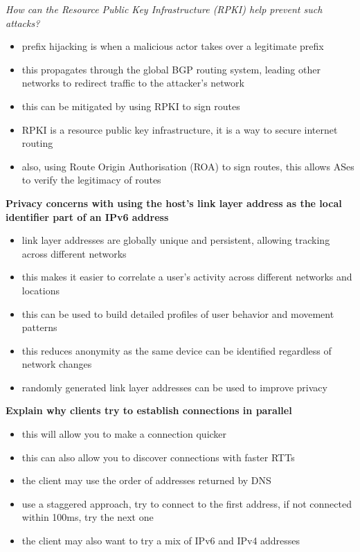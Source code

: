 \documentclass{article}
\begin{document}
\textit{How can the Resource Public Key Infrastructure (RPKI) help prevent such attacks?}
\begin{itemize}
    \item prefix hijacking is when a malicious actor takes over a legitimate prefix
    \item this propagates through the global BGP routing system, leading other networks to redirect traffic to the attacker's network
    \item this can be mitigated by using RPKI to sign routes
    \item RPKI is a resource public key infrastructure, it is a way to secure internet routing
    \item also, using Route Origin Authorisation (ROA) to sign routes, this allows ASes to verify the legitimacy of routes
\end{itemize}

\textbf{Privacy concerns with using the host's link layer address as the local identifier part of an IPv6 address}
\begin{itemize}
    \item link layer addresses are globally unique and persistent, allowing tracking across different networks
    \item this makes it easier to correlate a user's activity across different networks and locations
    \item this can be used to build detailed profiles of user behavior and movement patterns
    \item this reduces anonymity as the same device can be identified regardless of network changes
    \item randomly generated link layer addresses can be used to improve privacy
\end{itemize}


\textbf{Explain why clients try to establish connections in parallel}
\begin{itemize}
    \item this will allow you to make a connection quicker
    \item this can also allow you to discover connections with faster RTTs
    \item the client may use the order of addresses returned by DNS
    \item use a staggered approach, try to connect to the first address, if not connected within 100ms, try the next one
    \item the client may also want to try a mix of IPv6 and IPv4 addresses
\end{itemize}
\end{document}
